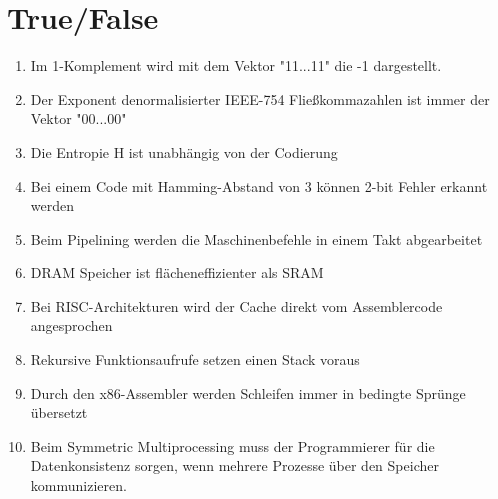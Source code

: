 \documentclass{exercisesheet}
\begin{document}
\section*{True/False}\label{sec:tf}
\begin{enumerate}
  \item Im 1-Komplement wird mit dem Vektor "11...11" die -1 dargestellt.
  \item Der Exponent denormalisierter IEEE-754 Fließkommazahlen ist immer der Vektor "00...00"
  \item Die Entropie H ist unabhängig von der Codierung
  \item Bei einem Code mit Hamming-Abstand von 3 können 2-bit Fehler erkannt werden
  \item Beim Pipelining werden die Maschinenbefehle in einem Takt abgearbeitet
  \item DRAM Speicher ist flächeneffizienter als SRAM
  \item Bei RISC-Architekturen wird der Cache direkt vom Assemblercode angesprochen
  \item Rekursive Funktionsaufrufe setzen einen Stack voraus
  \item Durch den x86-Assembler werden Schleifen immer in bedingte Sprünge übersetzt
  \item Beim Symmetric Multiprocessing muss der Programmierer für die Datenkonsistenz sorgen, wenn mehrere Prozesse über den Speicher kommunizieren.
\end{enumerate}
\end{document}
